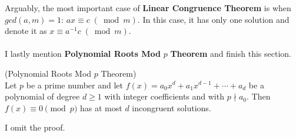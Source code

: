 Arguably, the most important case of \textbf{Linear Congruence Theorem} is when $gcd(a, m) = 1$: $ax\equiv c\; (\bmod{m})$. In this case, it has only one solution and denote it as $x\equiv a^{-1}c\; (\bmod{m})$. \\
\\
I lastly mention \textbf{Polynomial Roots Mod} $p$ \textbf{Theorem} and finish this section.

\begin{theorem}
(Polynomial Roots Mod $p$ Theorem) \\
Let $p$ be a prime number and let $f(x) = a_{0}x^{d} + a_{1}x^{d - 1} + \cdots + a_{d}$ be a polynomial of degree $d\geq 1$ with integer coefficients and with $p\nmid a_{0}$. Then $f(x)\equiv 0\pmod{p}$ has at most $d$ incongruent solutions.
\end{theorem}

\noindent
I omit the proof.